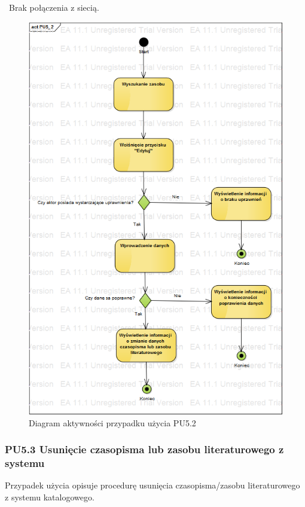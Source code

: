 \
Brak połączenia z siecią.


\begin{figure}[h!]
	\centering
	\includegraphics[scale=0.6]{img/diagrams/activityDiagrams/PU5_2}
	\caption{Diagram aktywności przypadku użycia PU5.2 \label{fig:labelADPU5.2}}
\end{figure}

\subsubsection{PU5.3 Usunięcie czasopisma lub zasobu literaturowego z systemu}

Przypadek użycia opisuje procedurę usunięcia czasopisma/zasobu literaturowego z systemu katalogowego.

